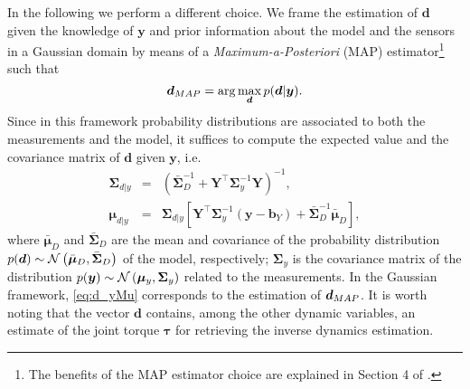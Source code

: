  In the following we perform a different choice.  
  We frame the estimation of $\bm d$ given the knowledge of $\bm y$ and prior information 
  about the model and the sensors in a Gaussian domain by
   means of a \emph{Maximum-a-Posteriori} (MAP) estimator\footnote{The benefits of the MAP
    estimator choice are explained in Section 4 of \cite{LatellaSensors2016}.} such that
%
\begin{equation*} 
\bm d_{\mbox\footnotesize{MAP}}=\arg \max_{\bm d} p(\bm d| \bm y) .
\end{equation*}
Since in this framework probability distributions are associated to both the measurements
 and the model, it suffices to
 compute the expected value and the covariance matrix of $\bm d$ given $\bm y$, i.e.
%
\begin{subequations}\label{eq:d_y} 
	\begin{eqnarray}\label{eq:d_ySigma} 
	 \bm {\Sigma}_{d|y}& = & \left(\bar{\bm {\Sigma}}_D^{-1}+ \bm Y^\top \bm 
	 {\Sigma}_{y}^{-1} \bm Y \right)^{-1},\\ \label{eq:d_yMu} 
	 \bm {\mu}_{d|y} &= & \bm {\Sigma}_{d|y} \left[ \bm Y ^\top \bm {\Sigma}_{y}^{-1} 
	 (\bm y - \bm b_Y) + \bar{\bm {\Sigma}}_D^{-1} \bar {\bm {\mu}}_D \right],
    \end{eqnarray} 
\end{subequations}
%
where $\bar{\bm {\mu}}_D$ and $\bar{\bm {\Sigma}}_D$ are the mean and 
covariance of the probability distribution 
 $\small{p(\bm d) \sim \mathcal N \left(\bar  
{\bm {\mu}}_D, \bar {\bm {\Sigma}}_D\right)}$ of the model, respectively;
 $\bm {\Sigma}_{y}$ is the covariance 
matrix of the distribution $\small{p(\bm y)\sim\mathcal N \left({\bm {\mu}}_y, {\bm {\Sigma}}_y\right)}$ related to the measurements.
  In the Gaussian framework, \eqref{eq:d_yMu} 
corresponds to the estimation of $\bm d_{\mbox\footnotesize{MAP}}$.  
It is worth noting that the vector $\bm d$ contains, among the other dynamic variables, an estimate of the joint torque $\bm \tau$ for retrieving the inverse dynamics estimation.